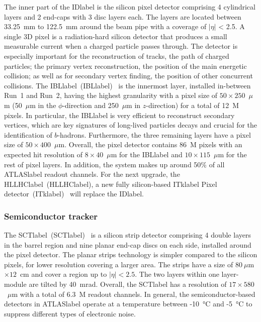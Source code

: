 The inner part of the \acrshort{IDlabel} is the silicon pixel detector comprising 4 cylindrical layers and 2 end-caps with 3 disc layers each. The layers are located between 33.25~mm to 122.5~mm around the beam pipe with a coverage of $|\eta|$ < 2.5. A single 3D pixel is a radiation-hard silicon detector that produces a small measurable current when a charged particle passes through. The detector is especially important for the reconstruction of tracks, the path of charged particles; the primary vertex reconstruction, the position of the main energetic collision; as well as for secondary vertex finding, the position of other concurrent collisions. The \acrlong{IBLlabel}~(\acrshort{IBLlabel})~\cite{Capeans:1291633} is the innermost layer, installed in-between Run~1 and Run~2, having the highest granularity with a pixel size of $50\times 250$~$\mu$m (50~$\mu$m in the $\phi$-direction and 250~$\mu$m in $z$-direction) for a total of 12~M pixels. In particular, the \acrshort{IBLlabel} is very efficient to reconstruct secondary vertices, which are key signatures of long-lived particles decays and crucial for the identification of $b$-hadrons. Furthermore, the three remaining layers have a pixel size of $50\times 400$~$\mu$m. Overall, the pixel detector contains 86~M pixels with an expected hit resolution of $8\times 40$~$\mu$m for the \acrshort{IBLlabel} and $10\times 115$~$\mu$m for the rest of pixel layers. In addition, the system makes up around 50\% of all \acrshort{ATLASlabel} readout channels. For the next upgrade, the \acrlong{HLLHClabel}~(\acrshort{HLLHClabel}), a new fully silicon-based \acrlong{ITklabel} Pixel detector~(\acrshort{ITklabel})~\cite{CERN-LHCC-2017-021} will replace the \acrshort{IDlabel}.

\subsubsection*{Semiconductor tracker}

The \acrlong{SCTlabel}~(\acrshort{SCTlabel})~\cite{HABER1998161,SCTperformance} is a silicon strip detector comprising 4 double layers in the barrel region and nine planar end-cap discs on each side, installed around the pixel detector. The planar strips technology is simpler compared to the silicon pixels, for lower resolution covering a larger area. The strips have a size of $80~\mu$m$\times 12$~cm and cover a region up to $|\eta|<2.5$. The two layers within one layer-module are tilted by 40~mrad. Overall, the \acrshort{SCTlabel} has a resolution of $17\times 580$~$\mu$m with a total of 6.3~M readout channels. In general, the semiconductor-based detectors in \acrshort{ATLASlabel} operate at a temperature between -10~°C and -5~°C to suppress different types of electronic noise.



